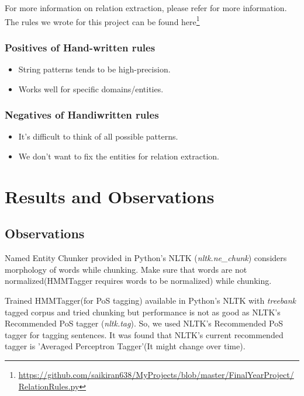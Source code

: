\documentclass[12pt]{report}
\begin{document}
\par For more information on relation extraction, please refer \cite{BookIE} for more information.
The rules we wrote for this project can be found here\footnote{\url{https://github.com/saikiran638/MyProjects/blob/master/FinalYearProject/RelationRules.py}}
\subsection{Positives of Hand-written rules}
\begin{itemize}
\item String patterns tends to be  high-precision.
\item Works well for specific domains/entities.
\end{itemize}

\subsection{Negatives of Handiwritten rules}
\begin{itemize}
\item It's difficult to think of all possible patterns.
\item We don't want to fix the entities for relation extraction.
\end{itemize}

\chapter{Results and Observations}
\section{Observations}
\par Named Entity Chunker provided in Python's NLTK (\textit{nltk.ne\_chunk}) considers morphology of 
words while chunking. Make sure that words are not normalized(HMMTagger requires words to 
be normalized) while chunking.
\par Trained HMMTagger(for PoS tagging) available in Python's NLTK with \textit{treebank} tagged corpus and
 tried chunking but performance is not as good as NLTK's Recommended PoS tagger (\textit{nltk.tag}).
 So, we used NLTK's Recommended PoS tagger for tagging sentences. It was found that NLTK's
  current recommended tagger is 'Averaged Perceptron Tagger'(It might change over time).
 
\end{document}
